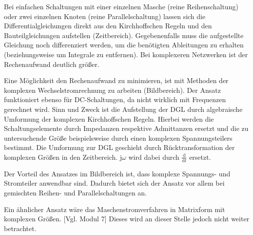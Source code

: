 \begin{frame}
{    %
    Bei einfachen Schaltungen mit einer einzelnen Masche (reine Reihenschaltung) oder zwei einzelnen Knoten (reine Parallelschaltung)
    lassen sich die Differentialgleichungen direkt aus den Kirchhoffschen Regeln und den Bauteilgleichungen aufstellen (Zeitbereich).
    Gegebenenfalls muss die aufgestellte Gleichung noch differenziert werden, um die benötigten Ableitungen zu erhalten
    (beziehungsweise um Integrale zu entfernen). 
    Bei komplexeren Netzwerken ist der Rechenaufwand deutlich größer. 

    Eine Möglichkeit den Rechenaufwand zu minimieren, ist mit Methoden der komplexen Wechselstromrechnung zu arbeiten (Bildbereich). 
    Der Ansatz funktioniert ebenso für DC-Schaltungen, da nicht wirklich mit Frequenzen gerechnet wird. 
    Sinn und Zweck ist die Aufstellung der DGL durch algebraische Umformung der komplexen Kirchhoffschen Regeln.
    Hierbei werden die Schaltungselemente durch Impedanzen respektive Admittanzen ersetzt und die zu untersuchende Größe
    beispielsweise durch einen komplexen Spannungsteilers bestimmt. 
    Die Umformung zur DGL geschieht durch Rücktransformation der komplexen Größen in den Zeitbereich.
    $\mathrm{j}\omega$ wird dabei durch $\frac{\mathrm{d}}{\mathrm{d} t}$ ersetzt. 
    
    Der Vorteil des Ansatzes im Bildbereich ist, dass komplexe Spannungs- und Stromteiler anwendbar sind. 
    Dadurch bietet sich der Ansatz vor allem bei gemischten Reihen- und Parallelschaltungen an.  

    Ein ähnlicher Ansatz wäre das Maschenstromverfahren in Matrixform mit komplexen Größen. [Vgl. Modul 7] 
    Dieses wird an dieser Stelle jedoch nicht weiter betrachtet.

}
\end{frame}

